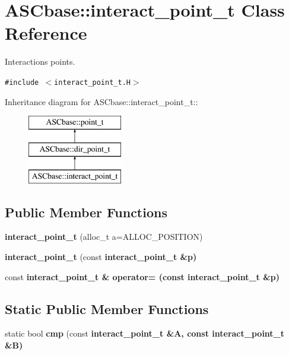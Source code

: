 \section{ASCbase::interact\_\-point\_\-t Class Reference}
\label{classASCbase_1_1interact__point__t}
Interactions points.  


{\tt \#include $<$interact\_\-point\_\-t.H$>$}

Inheritance diagram for ASCbase::interact\_\-point\_\-t::\begin{figure}[H]
\begin{center}
\leavevmode
\includegraphics[height=3cm]{classASCbase_1_1interact__point__t}
\end{center}
\end{figure}
\subsection*{Public Member Functions}
\begin{CompactItemize}
\item 
\textbf{interact\_\-point\_\-t} (alloc\_\-t a=ALLOC\_\-POSITION)\label{classASCbase_1_1interact__point__t_847336b4146fb570f5dbf56a0cd1d2dc}

\item 
\textbf{interact\_\-point\_\-t} (const \bf{interact\_\-point\_\-t} \&p)\label{classASCbase_1_1interact__point__t_2d6a71e803d863c51a4fbd9d141c563c}

\item 
const \bf{interact\_\-point\_\-t} \& \textbf{operator=} (const \bf{interact\_\-point\_\-t} \&p)\label{classASCbase_1_1interact__point__t_b4f20ff04e85bf54b0ef6652ff899c04}

\end{CompactItemize}
\subsection*{Static Public Member Functions}
\begin{CompactItemize}
\item 
static bool \textbf{cmp} (const \bf{interact\_\-point\_\-t} \&A, const \bf{interact\_\-point\_\-t} \&B)\label{classASCbase_1_1interact__point__t_422857df1c11412c9c2b750f9d2d3ee2}

\end{CompactItemize}
